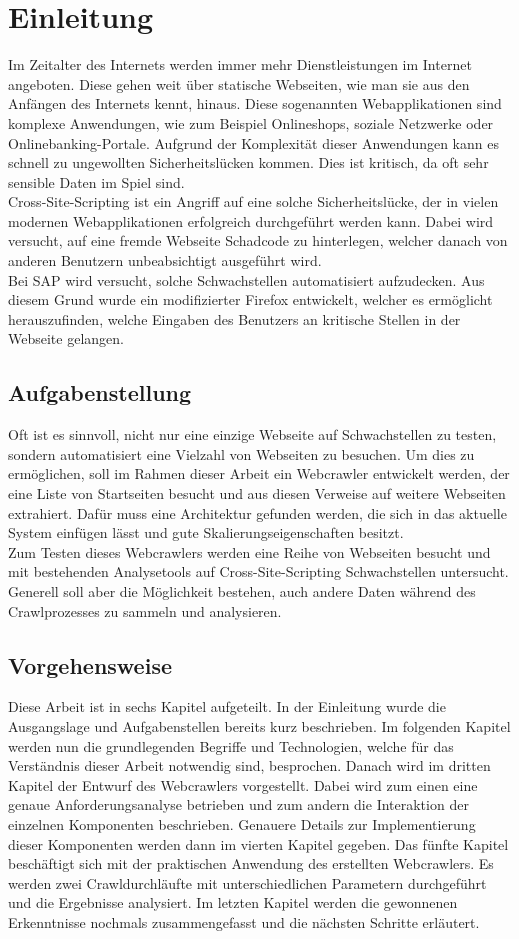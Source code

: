 \chapter{Einleitung}
Im Zeitalter des Internets werden immer mehr Dienstleistungen im Internet angeboten. Diese gehen weit über statische Webseiten, wie man sie aus den Anfängen des Internets kennt, hinaus. Diese sogenannten Webapplikationen sind komplexe Anwendungen, wie zum Beispiel Onlineshops, soziale Netzwerke oder Onlinebanking-Portale. Aufgrund der Komplexität dieser Anwendungen kann es schnell zu ungewollten Sicherheitslücken kommen. Dies ist kritisch, da oft sehr sensible Daten im Spiel sind. \\
Cross-Site-Scripting ist ein Angriff auf eine solche Sicherheitslücke, der in vielen modernen Webapplikationen erfolgreich durchgeführt werden kann. Dabei wird versucht, auf eine fremde Webseite Schadcode zu hinterlegen, welcher danach von anderen Benutzern unbeabsichtigt ausgeführt wird. \\
Bei SAP wird versucht, solche Schwachstellen automatisiert aufzudecken. Aus diesem Grund wurde ein modifizierter Firefox entwickelt, welcher es ermöglicht herauszufinden, welche Eingaben des Benutzers an kritische Stellen in der Webseite gelangen.
\section{Aufgabenstellung}
Oft ist es sinnvoll, nicht nur eine einzige Webseite auf Schwachstellen zu testen, sondern automatisiert eine Vielzahl von Webseiten zu besuchen. Um dies zu ermöglichen, soll im Rahmen dieser Arbeit ein Webcrawler entwickelt werden, der eine Liste von Startseiten besucht und aus diesen Verweise auf weitere Webseiten extrahiert. Dafür muss eine Architektur gefunden werden, die sich in das aktuelle System einfügen lässt und gute Skalierungseigenschaften besitzt. \\
Zum Testen dieses Webcrawlers werden eine Reihe von Webseiten besucht und mit bestehenden Analysetools auf Cross-Site-Scripting Schwachstellen untersucht. Generell soll aber die Möglichkeit bestehen, auch andere Daten während des Crawlprozesses zu sammeln und analysieren.
\section{Vorgehensweise}
Diese Arbeit ist in sechs Kapitel aufgeteilt. In der Einleitung wurde die Ausgangslage und Aufgabenstellen bereits kurz beschrieben. Im folgenden Kapitel werden nun die grundlegenden Begriffe und Technologien, welche für das Verständnis dieser Arbeit notwendig sind, besprochen. Danach wird im dritten Kapitel der Entwurf des Webcrawlers vorgestellt. Dabei wird zum einen eine genaue Anforderungsanalyse betrieben und zum andern die Interaktion der einzelnen Komponenten beschrieben. Genauere Details zur Implementierung dieser Komponenten werden dann im vierten Kapitel gegeben. Das fünfte Kapitel beschäftigt sich mit der praktischen Anwendung des erstellten Webcrawlers. Es werden zwei Crawldurchläufte mit unterschiedlichen Parametern durchgeführt und die Ergebnisse analysiert. Im letzten Kapitel werden die gewonnenen Erkenntnisse nochmals zusammengefasst und die nächsten Schritte erläutert.
